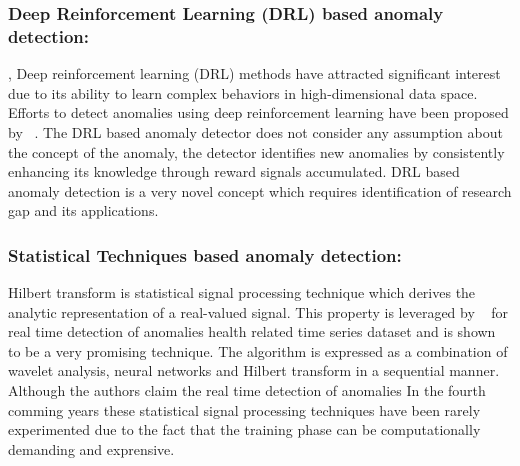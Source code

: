 \subsubsection{\textbf{Deep Reinforcement Learning (DRL) based anomaly detection:}}
\label{reinforcementlearning},
Deep reinforcement learning (DRL) methods have attracted significant interest due to its ability to learn complex behaviors in high-dimensional data space. Efforts to detect anomalies using deep reinforcement learning have been proposed by ~\cite{de2017learning,rlanomaly}.
The DRL based anomaly detector  does not consider any assumption about the concept of the anomaly,  the detector identifies new anomalies by consistently enhancing its knowledge  through reward signals accumulated. DRL based anomaly detection is a very novel concept which  requires identification of research gap and its applications.

\subsubsection{\textbf{Statistical Techniques based anomaly detection: }}
Hilbert transform is statistical signal processing technique which derives the analytic representation of a real-valued signal. This property is leveraged by ~\cite{kanarachos2015anomaly} for real time detection of anomalies health related time series dataset and is shown to be a very promising technique. The algorithm is expressed as a combination of wavelet analysis, neural networks and Hilbert transform in a sequential manner.  Although the authors claim the real time detection of anomalies In the fourth comming years these statistical signal processing techniques have been rarely experimented due to the fact that the training phase can be computationally demanding and exprensive.

